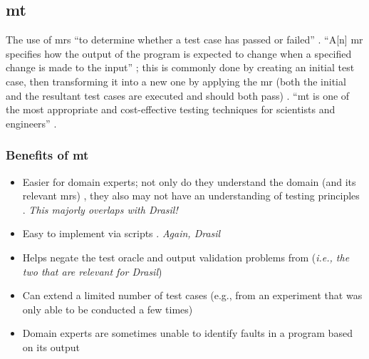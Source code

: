 \subsection{\acf{mt}}
\label{chap:notes:sec:metamorphic-testing}
The use of \acfp{mr} ``to determine whether a test case has passed or failed''
\citep[p.~67]{KanewalaAndYuehChen2019}. ``A[n] \acs{mr} specifies how the
output of the program is expected to change when a specified change is made to
the input'' \citep[p.~67]{KanewalaAndYuehChen2019}; this is commonly done by
creating an initial test case, then transforming it into a new one by applying
the \acs{mr} (both the initial and the resultant test cases are executed and
should both pass) \citep[p.~68]{KanewalaAndYuehChen2019}. ``\acs{mt} is one of
the most appropriate and cost-effective testing techniques for scientists and
engineers'' \citep[p.~72]{KanewalaAndYuehChen2019}.

\subsubsection{Benefits of \acs{mt}}
\begin{itemize}
      \item Easier for domain experts; not only do they understand the domain
            (and its relevant \acp{mr}) \citep[p.~70]{KanewalaAndYuehChen2019},
            they also may not have an understanding of testing principles
            \citep[p.~69]{KanewalaAndYuehChen2019}. \emph{This majorly
                  overlaps with Drasil!}
      \item Easy to implement via scripts \citep[p.~69]{KanewalaAndYuehChen2019}.
            \emph{Again, Drasil}
      \item Helps negate the test oracle \citep[p.~69]{KanewalaAndYuehChen2019}
            and output validation \citep[p.~70]{KanewalaAndYuehChen2019} problems
            from  (\emph{i.e.,
                  the two that are relevant for Drasil})
      \item Can extend a limited number of test cases (e.g., from an
            experiment that was only able to be conducted a few times)
            \citep[pp.~70-72]{KanewalaAndYuehChen2019}
      \item Domain experts are sometimes unable to identify faults in a program
            based on its output \citep[p.~71]{KanewalaAndYuehChen2019}
\end{itemize}

